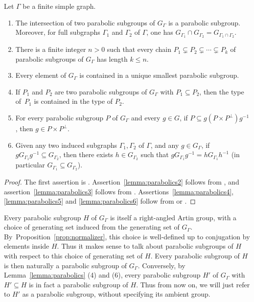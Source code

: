 \begin{lemma}\label{lemma:parabolics}
Let $\Gamma$ be a finite simple graph.
\begin{enumerate}
\item\label{lemma:parabolics1} The intersection of two parabolic subgroups of $G_\Gamma$ is a parabolic subgroup. Moreover, for full subgraphs $\Gamma_1$ and $\Gamma_2$ of $\Gamma$, one has $G_{\Gamma_1}\cap G_{\Gamma_2}=G_{\Gamma_1\cap\Gamma_2}$.
\item\label{lemma:parabolics2} There is a finite integer $n>0$ such that every chain $P_1\subsetneq P_2\subsetneq\cdots\subsetneq P_k$ of parabolic subgroups of $G_\Gamma$ has length $k\le n$.
\item\label{lemma:parabolics3} Every element of $G_\Gamma$ is contained in a unique smallest parabolic subgroup.
\item\label{lemma:parabolics4} If $P_1$ and $P_2$ are two parabolic subgroups of $G_\Gamma$ with $P_1\subseteq P_2$, then the type of~$P_1$ is contained in the type of $P_2$.
\item\label{lemma:parabolics5} For every parabolic subgroup $P$ of $G_\Gamma$ and every $g\in G$, if $P\subseteq g(P\times P^\perp)g^{-1}$, then $g\in P\times P^\perp$.
\item\label{lemma:parabolics6} Given any two induced subgraphs $\Gamma_1,\Gamma_2$ of $\Gamma$, and any $g\in G_\Gamma$, if \hbox{$g G_{\Gamma_1}g^{-1}\!\!\subseteq\! G_{\Gamma_2}$}, then there exists $h\in G_{\Gamma_2}$ such that $g G_{\Gamma_1}g^{-1}=h G_{\Gamma_1}h^{-1}$ (in particular $G_{\Gamma_1}\subseteq G_{\Gamma_2}$).
\end{enumerate}
\end{lemma}

\begin{proof}
The first assertion is \cite[Prop.\,2.6 \& Lem.\,2.7]{duncan2007parabolic}. Assertion~\eqref{lemma:parabolics2} follows from \cite[Prop.\,2.6]{duncan2007parabolic}, and assertion~\eqref{lemma:parabolics3} follows from \cite[Prop.\,2.8]{duncan2007parabolic}. Assertions~\eqref{lemma:parabolics4}, \eqref{lemma:parabolics5} and \eqref{lemma:parabolics6} follow from \cite[Cor.\,2.5]{duncan2007parabolic} or \cite[Prop.\,2.2]{charney2007automorphisms}.
\end{proof}

\begin{rk}
\label{remark:parabolic in parabolic}
Every parabolic subgroup $H$ of $G_\Gamma$ is itself a right-angled Artin group, with a choice of generating set induced from the generating set of $G_\Gamma$. By~Proposition~\ref{prop:normalizer}, this choice is well-defined up to conjugation by elements inside $H$. Thus it makes sense to talk about parabolic subgroups of $H$ with respect to this choice of generating set of $H$. Every parabolic subgroup of $H$ is then naturally a parabolic subgroup of $G_\Gamma$. Conversely, by Lemma~\ref{lemma:parabolics} (4) and (6), every parabolic subgroup $H'$ of $G_\Gamma$ with $H'\subseteq H$ is in fact a parabolic subgroup of $H$. Thus from now on, we will just refer to $H'$ as a parabolic subgroup, without specifying its ambient group.
\end{rk}

